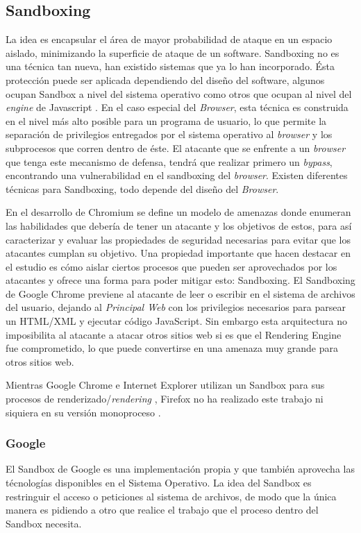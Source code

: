 \subsection{Sandboxing}
    \label{chap3:Sandboxing}
    La idea es encapsular el área de mayor probabilidad de ataque en un espacio aislado, minimizando la superficie de ataque de un software. Sandboxing no es una técnica tan nueva, han existido sistemas que ya lo han incorporado. Ésta protección puede ser aplicada dependiendo del diseño del software, algunos ocupan Sandbox a nivel del sistema operativo como otros que ocupan al nivel del \textit{engine} de Javascript \cite{reis2009browser}. En el caso especial del \textit{Browser}, esta técnica es construida en el nivel más alto posible para un programa de usuario, lo que permite la separación de privilegios entregados por el sistema operativo al \textit{browser} y los subprocesos que corren dentro de éste. El atacante que se enfrente a un \textit{browser} que tenga este mecanismo de defensa, tendrá que realizar primero un \textit{bypass}, encontrando una vulnerabilidad en el sandboxing del \textit{browser}. Existen diferentes técnicas para Sandboxing, todo depende del diseño del \textit{Browser}.

    En el desarrollo de Chromium \cite{barth2008security} se define un modelo de amenazas donde enumeran las habilidades que debería de tener un atacante y los objetivos de estos, para así caracterizar y evaluar las propiedades de seguridad necesarias para evitar que los atacantes cumplan su objetivo. Una propiedad importante que hacen destacar en el estudio es cómo aislar ciertos procesos que pueden ser aprovechados por los atacantes y ofrece una forma para poder mitigar esto: Sandboxing. El Sandboxing de Google Chrome previene al atacante de leer o escribir en el sistema de archivos del usuario, dejando al \textit{Principal Web} con los privilegios necesarios para parsear un HTML/XML y ejecutar código JavaScript. Sin embargo esta arquitectura no imposibilita al atacante a atacar otros sitios web si es que el Rendering Engine fue comprometido, lo que puede convertirse en una amenaza muy grande para otros sitios web.

    Mientras Google Chrome e Internet Explorer utilizan un Sandbox para sus procesos de renderizado/\textit{rendering} \cite{sandboxGC}, Firefox no ha realizado este trabajo ni siquiera en su versión monoproceso \cite{NeckoElectro}.



    \subsubsection{Google}
        El Sandbox de Google es una implementación propia y que también aprovecha las técnologías disponibles en el Sistema Operativo. La idea del Sandbox es restringuir el acceso o peticiones al sistema de archivos, de modo que la única manera es pidiendo a otro que realice el trabajo que el proceso dentro del Sandbox necesita.

